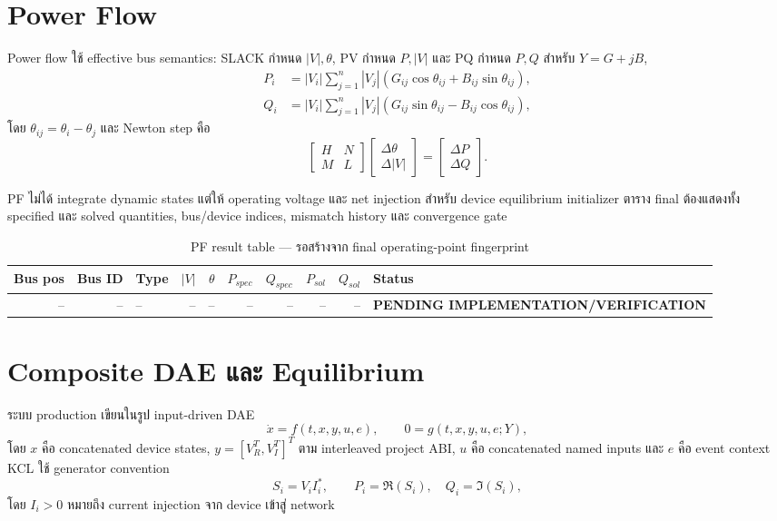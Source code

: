 \documentclass[12pt,a4paper]{article}
\newcommand{\pending}{\textcolor{red!75!black}{\textbf{PENDING IMPLEMENTATION/VERIFICATION}}}
\begin{document}
\section{Power Flow}

Power flow ใช้ effective bus semantics: SLACK กำหนด $|V|,\theta$, PV กำหนด $P,|V|$
และ PQ กำหนด $P,Q$ สำหรับ $Y=G+jB$,
\begin{align}
P_i &= |V_i|\sum_{j=1}^{n}|V_j|
\left(G_{ij}\cos\theta_{ij}+B_{ij}\sin\theta_{ij}\right),\\
Q_i &= |V_i|\sum_{j=1}^{n}|V_j|
\left(G_{ij}\sin\theta_{ij}-B_{ij}\cos\theta_{ij}\right),
\end{align}
โดย $\theta_{ij}=\theta_i-\theta_j$ และ Newton step คือ
\begin{equation}
\begin{bmatrix}H&N\\M&L\end{bmatrix}
\begin{bmatrix}\Delta\theta\\\Delta|V|\end{bmatrix}
=\begin{bmatrix}\Delta P\\\Delta Q\end{bmatrix}.
\end{equation}

PF ไม่ได้ integrate dynamic states แต่ให้ operating voltage และ net injection สำหรับ
device equilibrium initializer ตาราง final ต้องแสดงทั้ง specified และ solved quantities,
bus/device indices, mismatch history และ convergence gate

\begin{table}[H]\centering\small
\caption{PF result table --- รอสร้างจาก final operating-point fingerprint}
\begin{tabularx}{\textwidth}{rrlrrrrrrX}
\toprule
Bus pos & Bus ID & Type & $|V|$ & $\theta$ & $P_{spec}$ & $Q_{spec}$ & $P_{sol}$ & $Q_{sol}$ & Status \\\midrule
-- & -- & -- & -- & -- & -- & -- & -- & -- & \pending \\
\bottomrule
\end{tabularx}
\end{table}

\section{Composite DAE และ Equilibrium}

ระบบ production เขียนในรูป input-driven DAE
\begin{equation}
\dot x=f(t,x,y,u,e),\qquad 0=g(t,x,y,u,e;Y),
\label{eq:composite-dae}
\end{equation}
โดย $x$ คือ concatenated device states, $y=[V_R^T,V_I^T]^T$ ตาม interleaved
project ABI, $u$ คือ concatenated named inputs และ $e$ คือ event context
KCL ใช้ generator convention
\begin{equation}
S_i=V_i I_i^*,\qquad P_i=\Re(S_i),\quad Q_i=\Im(S_i),
\end{equation}
โดย $I_i>0$ หมายถึง current injection จาก device เข้าสู่ network
\end{document}
